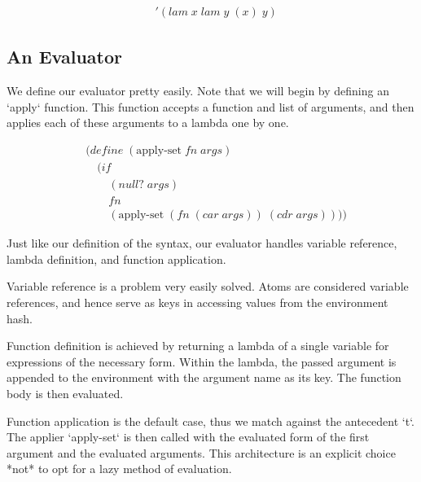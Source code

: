 \documentclass[11pt]{article}
\begin{document}
\begin{align*}
& '(lam \; x \; lam \; y \; (x) \; y)
\end{align*}

\subsection{An Evaluator}
We define our evaluator pretty easily. Note that we will begin by defining an `apply` function. This function accepts a function and list of arguments, and then applies each of these arguments to a lambda one by one.

\begin{align*}
& (define \; (\text{apply-set} \; fn \; args)
\\& \quad (if
\\& \qquad (null? \; args)
\\& \qquad fn
\\& \qquad (\text{apply-set} \; (fn \; (car \; args)) \; (cdr \; args))))
\end{align*}

Just like our definition of the syntax, our evaluator handles variable reference, lambda definition, and function application. 

Variable reference is a problem very easily solved. Atoms are considered variable references, and hence serve as keys in accessing values from the environment hash.

Function definition is achieved by returning a lambda of a single variable for expressions of the necessary form. Within the lambda, the passed argument is appended to the environment with the argument name as its key. The function body is then evaluated.

Function application is the default case, thus we match against the antecedent `t`. The applier `apply-set` is then called with the evaluated form of the first argument and the evaluated arguments. This architecture is an explicit choice *not* to opt for a lazy method of evaluation.
\end{document}

